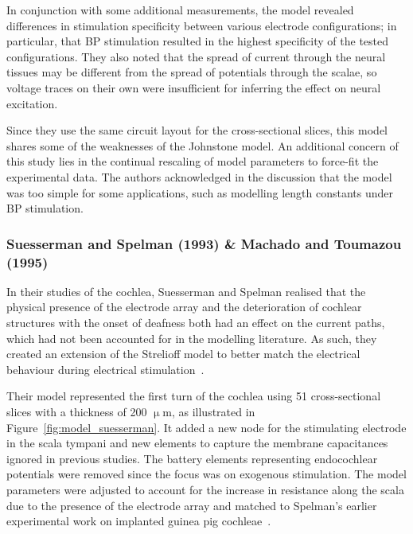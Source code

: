 In conjunction with some additional measurements, the model revealed differences
in stimulation specificity between various electrode configurations; in
particular, that BP stimulation resulted in the highest specificity of the
tested configurations. They also noted that the spread of current through the
neural tissues may be different from the spread of potentials through the
scalae, so voltage traces on their own were insufficient for inferring the
effect on neural excitation.

Since they use the same circuit layout for the cross-sectional slices, this
model shares some of the weaknesses of the Johnstone model. An additional
concern of this study lies in the continual rescaling of model parameters to
force-fit the experimental data. The authors acknowledged in the discussion that
the model was too simple for some applications, such as modelling length
constants under BP stimulation.

\subsubsection{Suesserman and Spelman (1993) \& Machado and Toumazou (1995)}

In their studies of the cochlea, Suesserman and Spelman realised that the
physical presence of the electrode array and the deterioration of cochlear
structures with the onset of deafness both had an effect on the current paths,
which had not been accounted for in the modelling literature. As such, they
created an extension of the Strelioff model to better match the \invivo{}
electrical behaviour during electrical stimulation~\cite{suesserman1993}.

Their model represented the first turn of the cochlea using 51 cross-sectional
slices with a thickness of 200 $ \upmu $m, as illustrated in
Figure~\ref{fig:model_suesserman}. It added a new node for the stimulating
electrode in the scala tympani and new elements to capture the membrane
capacitances ignored in previous studies. The battery elements representing
endocochlear potentials were removed since the focus was on exogenous
stimulation. The model parameters were adjusted to account for the increase in
resistance along the scala due to the presence of the electrode array and
matched to Spelman's earlier experimental work on implanted guinea pig
cochleae~\cite{spelman1982}.

